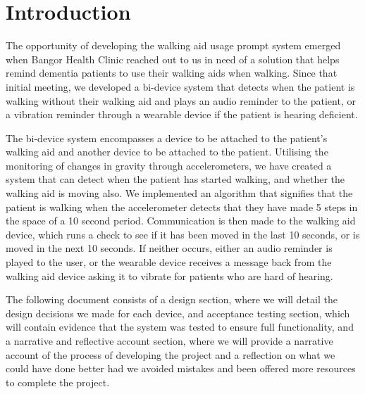 \chapter{Introduction}

The opportunity of developing the walking aid usage prompt system emerged when Bangor Health Clinic reached out to us in need of a solution that helps remind dementia patients to use their walking aids when walking. Since that initial meeting, we developed a bi-device system that detects when the patient is walking without their walking aid and plays an audio reminder to the patient, or a vibration reminder through a wearable device if the patient is hearing deficient. 

The bi-device system encompasses a device to be attached to the patient's walking aid and another device to be attached to the patient. Utilising the monitoring of changes in gravity through accelerometers, we have created a system that can detect when the patient has started walking, and whether the walking aid is moving also. We implemented an algorithm that signifies that the patient is walking when the accelerometer detects that they have made 5 steps in the space of a 10 second period. Communication is then made to the walking aid device, which runs a check to see if it has been moved in the last 10 seconds, or is moved in the next 10 seconds. If neither occurs, either an audio reminder is played to the user, or the wearable device receives a message back from the walking aid device asking it to vibrate for patients who are hard of hearing. 

The following document consists of a design section, where we will detail the design decisions we made for each device, and acceptance testing section, which will contain evidence that the system was tested to ensure full functionality, and a narrative and reflective account section, where we will provide a narrative account of the process of developing the project and a reflection on what we could have done better had we avoided mistakes and been offered more resources to complete the project.
